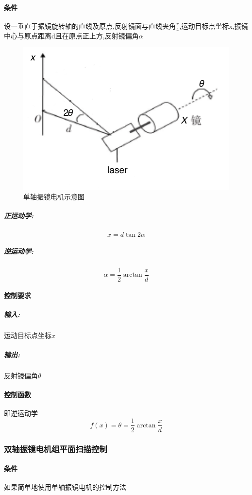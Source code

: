 \documentclass[a4paper,12pt,onecolumn,twoside]{article}
\begin{document}
\paragraph{条件}
设一垂直于振镜旋转轴的直线及原点,反射镜面与直线夹角$\frac{\pi}{4}$,运动目标点坐标x,振镜中心与原点距离d且在原点正上方,反射镜偏角$\alpha$
\begin{figure}[ht]
\centering     
\includegraphics[width=\linewidth]{MG3.png}
\caption{单轴振镜电机示意图}
\end{figure}
\subparagraph{正运动学:}
\begin{equation}
x=d\tan2\alpha 
\end{equation}
\subparagraph{逆运动学:}
\begin{equation}
\alpha =\frac{1}{2}\arctan\frac{x}{d}
\end{equation}
\paragraph{控制要求}
\subparagraph{输入:}
运动目标点坐标$x$
\subparagraph{输出:}
反射镜偏角$\theta$
\paragraph{控制函数}即逆运动学
\begin{equation}
f(x)=\theta =\frac{1}{2} \arctan\frac{x}{d}
\end{equation}
\clearpage
\subsubsection{双轴振镜电机组平面扫描控制}

\paragraph{条件}
如果简单地使用单轴振镜电机的控制方法
\end{document}
